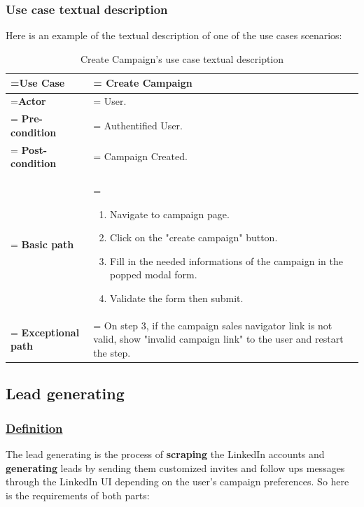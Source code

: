 \subsubsection{Use case textual description}
Here is an example of the textual description of one of the use cases scenarios:

\begin{table}[H]
	\renewcommand{\arraystretch}{1.5}%
	\caption{Create Campaign's use case textual description}
	\centering
	\medskip
	\begin{tabularx}{1\textwidth} {
			| >{\hsize=0.5\hsize\linewidth=\hsize\centering\arraybackslash}X
			| >{\hsize=1.5\hsize\linewidth=\hsize\justifying\arraybackslash}X |}
		\hline
		\textbf {Use Case}        & \noindent Create Campaign                           \\
		\hline
		\textbf {Actor}            & \noindent User.                 \\
		\hline
		\textbf {Pre-condition}            & \noindent Authentified User.                 \\
		\hline
		\textbf {Post-condition}           & \noindent Campaign Created. \\
		\hline
		\textbf {Basic path}            & \noindent    \begin{enumerate}
			\item Navigate to campaign page.
			\item Click on the "create campaign" button.
			\item Fill in the needed informations of the campaign in the popped modal form.
			\item Validate the form then submit.
		\end{enumerate}                               \\
		\hline
		\textbf {Exceptional path}            & \noindent On step 3, if the campaign sales navigator link is not valid, show "invalid campaign link" to the user and restart the step.                                  \\
		\hline
	\end{tabularx}
\end{table}
\subsection{Lead generating}

\subsubsection*{\underline{Definition}}
The lead generating is the process of \textbf{scraping} the LinkedIn accounts and \textbf{generating} leads by sending them customized invites and follow ups messages through the LinkedIn UI depending on the user's campaign preferences.
So here is the requirements of both parts:

